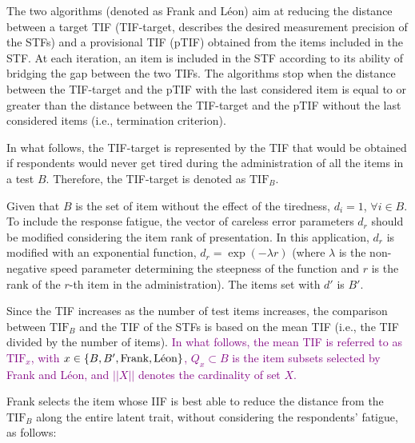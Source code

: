 \documentclass{svproc}
\newcommand{\ottavia}[1]{\textcolor{purple}{#1}}
\begin{document}
The two algorithms (denoted as Frank and Léon) aim at reducing the distance between a target TIF (TIF-target, describes the desired measurement precision of the STFs) and a provisional TIF (pTIF) obtained from the items included in the STF. 
At each iteration, an item is included in the STF according to its ability of bridging the gap between the two TIFs. 
The algorithms stop when the distance between the TIF-target and the pTIF with the last considered item is equal to or greater than the distance between the TIF-target and the pTIF without the last considered items (i.e., termination criterion). 

In what follows, the TIF-target is represented by the TIF that would be obtained if respondents would never get tired during the administration of all the items in a test $B$. Therefore, the TIF-target is denoted as  $\text{TIF}_B$.

Given that $B$ is the set of item without the effect of the tiredness, $d_i = 1$, $\forall i \in B$. To include the response fatigue, the vector of careless error parameters $d_r$ should be modified considering the item rank of presentation. In this application, $d_r$ is modified with an exponential function, $d_r = \exp(-\lambda r)$ (where $\lambda$ is the non-negative speed parameter determining the steepness of the function and $r$ is the rank of the $r$-th item in the administration). 
The items set with $d'$ is $B'$.

Since the TIF increases as the number of test items increases, the comparison between $\text{TIF}_B$ and the TIF of the STFs is based on the mean TIF (i.e., the TIF divided by the number of items). 
\ottavia{In what follows, the mean TIF  is referred to as $\text{TIF}_{x}$, with $x \in \{B, B', \text{Frank}, \text{\text{Léon}}\}$, $Q_x \subset B$ is the item subsets selected by Frank and Léon, and $||X||$ denotes the cardinality of set $X$.} 




Frank selects the item whose IIF is best able to reduce the distance from the $\text{TIF}_B$ along the entire latent trait, without considering the respondents' fatigue, as follows:
\end{document}
